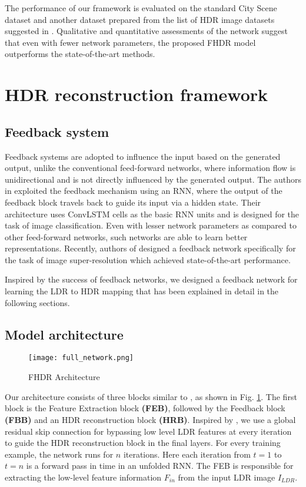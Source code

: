 \documentclass[conference]{IEEEtran}
\begin{document}
The performance of our framework is evaluated on the standard City Scene dataset \cite{zhang2017learning} and another dataset prepared from the list of HDR image datasets suggested in \cite{eilertsen2017hdr}. 
Qualitative and quantitative assessments of the network suggest that even with fewer network parameters, the proposed FHDR model outperforms the state-of-the-art methods.



\section{HDR reconstruction framework}
\subsection{Feedback system}
Feedback systems are adopted to influence the input based on the generated output, unlike the conventional feed-forward networks, where information flow is unidirectional and is not directly influenced by the generated output.
The authors in \cite{zamir2017feedback} exploited the feedback mechanism using an RNN, where the output of the feedback block travels back to guide its input via a hidden state. Their architecture uses ConvLSTM cells as the basic RNN units and is designed for the task of image classification. Even with lesser network parameters as compared to other feed-forward networks, such networks are able to learn better representations.
Recently, authors of \cite{li2019srfbn} designed a feedback network specifically for the task of image super-resolution which achieved state-of-the-art performance.
\par 
Inspired by the success of feedback networks, we designed a feedback network for learning the LDR to HDR mapping that has been explained in detail in the following sections.


\subsection{Model architecture}
\begin{figure}[htbp]
\centering
 \texttt{[image: full\_network.png]}
\caption{FHDR Architecture}
\label{fig1}
\end{figure}

Our architecture consists of three blocks similar to \cite{li2019srfbn}, as shown in Fig. \ref{fig1}. The first block is the Feature Extraction block \textbf{(FEB)}, followed by the Feedback block \textbf{(FBB)} and an HDR reconstruction block \textbf{(HRB)}. Inspired by \cite{zhang2018residual}, we use a global residual skip connection for bypassing low level LDR features at every iteration to guide the HDR reconstruction block in the final layers.
For every training example, the network runs for $n$ iterations. Here each iteration from $t=1$ to $t=n$ is a forward pass in time in an unfolded RNN.
The FEB is responsible for extracting the low-level feature information $F_{in}$ from the input LDR image $I_{LDR}$.
\end{document}
